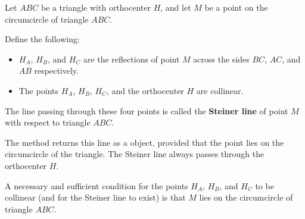 Let $ABC$ be a triangle with orthocenter $H$, and let $M$ be a point on the circumcircle of triangle $ABC$.

\medskip
\noindent
Define the following:
\begin{itemize}
  \item $H_A$, $H_B$, and $H_C$ are the reflections of point $M$ across the sides $BC$, $AC$, and $AB$ respectively.
  \item The points $H_A$, $H_B$, $H_C$, and the orthocenter $H$ are collinear.
\end{itemize}

\noindent
The line passing through these four points is called the \textbf{Steiner line} of point $M$ with respect to triangle $ABC$.

\medskip
\noindent
The method  returns this line as a  object, provided that the point  lies on the circumcircle of the triangle. The Steiner line always passes through the orthocenter $H$.

\medskip
\noindent
A necessary and sufficient condition for the points $H_A$, $H_B$, and $H_C$ to be collinear (and for the Steiner line to exist) is that $M$ lies on the circumcircle of triangle $ABC$.

\vspace{1em}

\begin{tkzexample}[vbox]
\begin{center}
\end{center}
\end{tkzexample}


